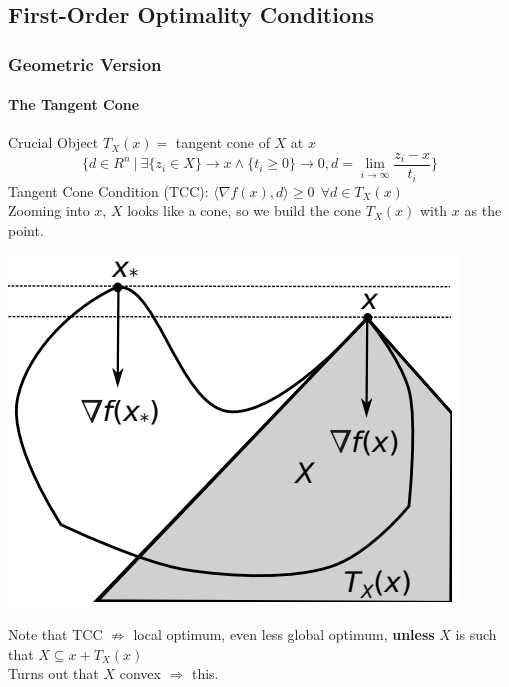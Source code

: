 \documentclass[10pt]{report}
\begin{document}
\subsection{First-Order Optimality Conditions}
\subsubsection{Geometric Version}
\paragraph{The Tangent Cone} Crucial Object $T_X(x) =$ tangent cone of $X$ at $x$
$$\{d\in R^n\:|\:\exists\{z_i\in X\}\rightarrow x\wedge \{t_i\geq 0\}\rightarrow 0, d=\lim_{i\to\infty}\frac{z_i-x}{t_i}\}$$
Tangent Cone Condition (TCC): $\langle\nabla f(x),d\rangle \geq 0\:\:\forall d\in T_X(x)$\\Zooming into $x$, $X$ looks like a cone, so we build the cone $T_X(x)$ with $x$ as the point.

\begin{center}
	\includegraphics[scale=0.75]{9.png}
\end{center}
Note that TCC $\not\Rightarrow$ local optimum, even less global optimum, \textbf{unless} $X$ is such that $X\subseteq x + T_X(x)$\\
Turns out that $X$ convex $\Rightarrow$ this.
\end{document}
